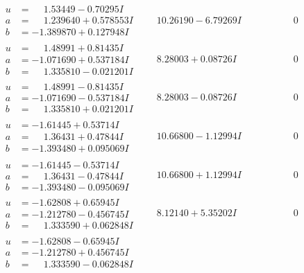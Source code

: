 \documentclass[1p]{elsarticle_modified}
\theoremstyle{definition}
\begin{document}
$$\begin{array}{c|c|c}
\begin{aligned}
u &= \phantom{-}1.53449 - 0.70295 I \\
a &= \phantom{-}1.239640 + 0.578553 I \\
b &= -1.389870 + 0.127948 I\end{aligned}
 & \phantom{-}10.26190 - 6.79269 I & \phantom{-0.000000 } 0 \\ \hline\begin{aligned}
u &= \phantom{-}1.48991 + 0.81435 I \\
a &= -1.071690 + 0.537184 I \\
b &= \phantom{-}1.335810 - 0.021201 I\end{aligned}
 & \phantom{-}8.28003 + 0.08726 I & \phantom{-0.000000 } 0 \\ \hline\begin{aligned}
u &= \phantom{-}1.48991 - 0.81435 I \\
a &= -1.071690 - 0.537184 I \\
b &= \phantom{-}1.335810 + 0.021201 I\end{aligned}
 & \phantom{-}8.28003 - 0.08726 I & \phantom{-0.000000 } 0 \\ \hline\begin{aligned}
u &= -1.61445 + 0.53714 I \\
a &= \phantom{-}1.36431 + 0.47844 I \\
b &= -1.393480 + 0.095069 I\end{aligned}
 & \phantom{-}10.66800 - 1.12994 I & \phantom{-0.000000 } 0 \\ \hline\begin{aligned}
u &= -1.61445 - 0.53714 I \\
a &= \phantom{-}1.36431 - 0.47844 I \\
b &= -1.393480 - 0.095069 I\end{aligned}
 & \phantom{-}10.66800 + 1.12994 I & \phantom{-0.000000 } 0 \\ \hline\begin{aligned}
u &= -1.62808 + 0.65945 I \\
a &= -1.212780 - 0.456745 I \\
b &= \phantom{-}1.333590 + 0.062848 I\end{aligned}
 & \phantom{-}8.12140 + 5.35202 I & \phantom{-0.000000 } 0 \\ \hline\begin{aligned}
u &= -1.62808 - 0.65945 I \\
a &= -1.212780 + 0.456745 I \\
b &= \phantom{-}1.333590 - 0.062848 I\end{aligned}

\end{array}$$
\end{document}
